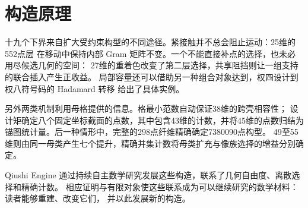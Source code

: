 \section{构造原理}

十九个下界来自扩大受约束构型的不同途径。紧接触并不总会阻止运动：25维的552点层
在移动中保持内部 Gram 矩阵不变。一个不能直接补点的选择，也未必用尽候选几何的空间：
27维的重着色改变了第二层选择，共享阻挡则让一组支持的联合插入产生正收益。
局部容量还可以借助另一种组合对象达到，权四设计到权八符号码的 Hadamard 转移
给出了具体实例。

另外两类机制利用母格提供的信息。格最小范数自动保证38维的跨壳相容性；
设计矩确定八个固定坐标截面的点数，其中包含43维的计数，并将45维的点数归结为
锚图统计量。后一种情形中，完整的298点纤维精确确定7380090点构型。
49至55维则由同一母类产生七个提升，精确并集计数将母类扩充与像族选择的增益分别确定。

Qiushi Engine 通过持续自主数学研究发展这些构造，联系了几何自由度、离散选择和精确计数。
相应证明与有限对象使这些联系成为可以继续研究的数学材料：读者能够重建、改变它们，
并以此发展新的构造。
